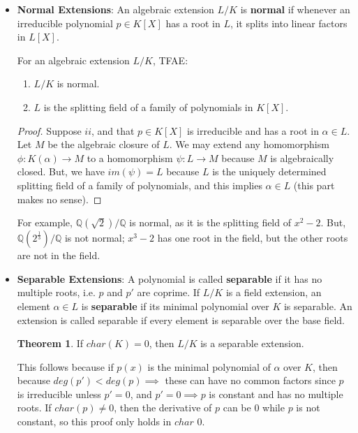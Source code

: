 \documentclass[11pt, oneside]{amsart}   	%
\theoremstyle{definition}
\newtheorem{theorem}{Theorem}[section]
\begin{document}
\begin{itemize}

	\item \textbf{Normal Extensions}: An algebraic extension $L / K$ is \textbf{normal} if whenever an irreducible polynomial $p\in K[X]$ has a root in $L$, it 
	splits into linear factors in $L[X]$. 
	
	For an algebraic extension $L / K$, TFAE:
	
	\begin{enumerate}
	
		\item $L / K$ is normal.
		
		\item $L$ is the splitting field of a family of polynomials in $K[X]$. 
	
	\end{enumerate}
	
	\begin{proof}
	
		Suppose $ii$, and that $p\in K[X]$ is irreducible and has a root in $\alpha\in L$. Let $M$ be the algebraic closure of $L$. We may extend any 
		homomorphism $\phi : K(\alpha)\rightarrow M$ to a homomorphism $\psi : L\rightarrow M$ because $M$ is algebraically closed. But, we have 
		$im(\psi) = L$ because $L$ is the uniquely determined splitting field of a family of polynomials, and this implies $\alpha\in L$ (this part makes 
		no sense).
	
	\end{proof}
	
	For example, $\mathbb Q(\sqrt{2}) / \mathbb Q$ is normal, as it is the splitting field of $x^2 - 2$. But, $\mathbb Q(2^{\frac{1}{3}}) / \mathbb Q$ is not 
	normal; $x^3 - 2$ has one root in the field, but the other roots are not in the field.
	
	\item \textbf{Separable Extensions}: A polynomial is called \textbf{separable} if it has no multiple roots, i.e. $p$ and $p'$ are coprime. If $L / K$ is a field 
	extension, an element $\alpha\in L$ is \textbf{separable} if its minimal polynomial over $K$ is separable. An extension is called separable if every 
	element is separable over the base field. 
	
	\begin{theorem} If $char(K) = 0$, then $L / K$ is a separable extension. \end{theorem}
	
	This follows because if $p(x)$ is the minimal polynomial of $\alpha$ over $K$, then because $deg(p') < deg(p)\implies$ these can have no common 
	factors since $p$ is irreducible unless $p' = 0$, and $p' = 0\implies p$ is constant and has no multiple roots. If $char(p) \neq 0$, then the derivative 
	of $p$ can be $0$ while $p$ is not constant, so this proof only holds in $char$ 0.
	

\end{itemize}
\end{document}

